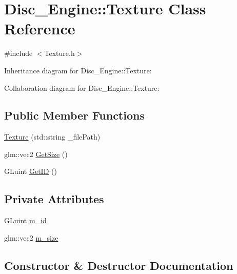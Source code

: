 \hypertarget{class_disc___engine_1_1_texture}{}\section{Disc\+\_\+\+Engine\+:\+:Texture Class Reference}
\label{class_disc___engine_1_1_texture}


{\ttfamily \#include $<$Texture.\+h$>$}



Inheritance diagram for Disc\+\_\+\+Engine\+:\+:Texture\+:


Collaboration diagram for Disc\+\_\+\+Engine\+:\+:Texture\+:
\subsection*{Public Member Functions}
\begin{DoxyCompactItemize}
\item 
\mbox{\hyperlink{class_disc___engine_1_1_texture_a64c067b1a0c619d381d13e0767df59bf}{Texture}} (std\+::string \+\_\+file\+Path)
\item 
glm\+::vec2 \mbox{\hyperlink{class_disc___engine_1_1_texture_adddda6a2d0a839b4bd813a3db54c303d}{Get\+Size}} ()
\item 
G\+Luint \mbox{\hyperlink{class_disc___engine_1_1_texture_ac3a17cbf58ec456f23bd254442ef61c5}{Get\+ID}} ()
\end{DoxyCompactItemize}
\subsection*{Private Attributes}
\begin{DoxyCompactItemize}
\item 
G\+Luint \mbox{\hyperlink{class_disc___engine_1_1_texture_a6bec076fd3134201077ec535163bbaa8}{m\+\_\+id}}
\item 
glm\+::vec2 \mbox{\hyperlink{class_disc___engine_1_1_texture_a400d4a50bbdee9742fe6dbb15331ab17}{m\+\_\+size}}
\end{DoxyCompactItemize}


\subsection{Constructor \& Destructor Documentation}
\mbox{\label{class_disc___engine_1_1_texture_a64c067b1a0c619d381d13e0767df59bf}} 

